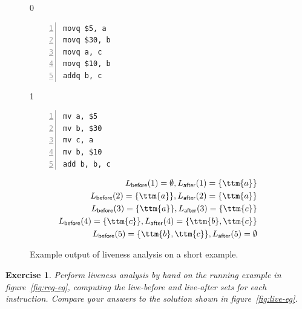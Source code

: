 \documentclass[7x10]{TimesAPriori_MIT}%
\def\xeightysixEd{0}
\def\riscvEd{1}
\def\architecture{1}
\newtheorem{exercise}[theorem]{Exercise}
\numberwithin{theorem}{chapter}
\numberwithin{definition}{chapter}
\numberwithin{equation}{chapter}
\begin{document}
\begin{figure}[tbp]
  \centering
  \begin{tcolorbox}[colback=white]
    \hspace{10pt}
  \begin{minipage}{0.4\textwidth}
\if\architecture\xeightysixEd
\begin{lstlisting}[numbers=left,numberstyle=\tiny]
movq $5, a
movq $30, b
movq a, c
movq $10, b
addq b, c
\end{lstlisting}
\fi
\if\architecture\riscvEd
\begin{lstlisting}[numbers=left,numberstyle=\tiny]
mv a, $5
mv b, $30
mv c, a
mv b, $10
add b, b, c
\end{lstlisting}
\fi
\end{minipage}
\vrule\hspace{10pt}
\begin{minipage}{0.45\textwidth}
\begin{align*}
L_{\mathsf{before}}(1)=  \emptyset, 
L_{\mathsf{after}}(1)=  \{\ttm{a}\}\\
L_{\mathsf{before}}(2)=  \{\ttm{a}\},
L_{\mathsf{after}}(2)=  \{\ttm{a}\}\\
L_{\mathsf{before}}(3)=  \{\ttm{a}\},
L_{\mathsf{after}}(3)=  \{\ttm{c}\}\\
L_{\mathsf{before}}(4)=  \{\ttm{c}\},
L_{\mathsf{after}}(4)=  \{\ttm{b},\ttm{c}\}\\
L_{\mathsf{before}}(5)=  \{\ttm{b},\ttm{c}\},
L_{\mathsf{after}}(5)=  \emptyset
\end{align*}
\end{minipage}
\end{tcolorbox}
\caption{Example output of liveness analysis on a short example.}
\label{fig:liveness-example-0}
\end{figure}

\begin{exercise}\normalfont\normalsize
  Perform liveness analysis by hand on the running example in
  figure~\ref{fig:reg-eg}, computing the live-before and live-after
  sets for each instruction. Compare your answers to the solution
  shown in figure~\ref{fig:live-eg}.
\end{exercise}
\end{document}
